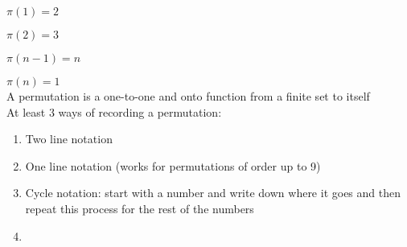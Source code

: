 \documentclass[executivepaper]{extarticle}
\begin{document}
$\pi(1)=2$

$\pi(2)=3$

$\pi(n-1)=n$

$\pi(n)=1$\\

A permutation is a one-to-one and onto function from a finite set to itself \\

At least 3 ways of recording a permutation: \\

\begin{enumerate}

\item Two line notation

\item One line notation (works for permutations of order up to 9)

\item Cycle notation: start with a number and write down where it goes and then repeat this process for the rest of the numbers

\item 

\end{enumerate}
\end{document}
